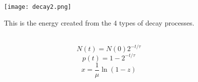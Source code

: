 \documentclass[12pt]{article}
\begin{document}
\begin{figure}
    \centering
    \texttt{[image: decay2.png]}
    \caption{This is the energy created from the 4 types of decay processes.}
    \label{fig:enter-label}
\end{figure}


 \\

\begin{equation}
    N(t) = N(0) 2^{-t/\tau}
    \label{eq:placeholder_label}
\end{equation}
\begin{equation}
    p(t) = 1 - 2^{-t/\tau}
    \label{eq:placeholder_label}
\end{equation}
\begin{equation}
    x = \frac{1}{\mu} \ln(1 - z)
    \label{placeholder}
\end{equation}


\vskip0.1in
\\
\end{document}
